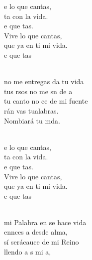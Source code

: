 \begin{cancion}%
	\begin{chorus}%
	e lo que cantas, \\
	ta con la vida.\\
	e que tas.\\
Vive lo que cantas,\\
	que ya en ti mi vida.\\
	e que tas    \\
	\end{chorus}%
	\jump\\
	no me entregas da tu vida\\
	tus rsos no me sn de a\\
	tu canto no ce de mi fuente\\
	rán vas tualabras.\\
	Nombiará tu mda.\\\jump\\
	\begin{chorus}%
	e lo que cantas, \\
	ta con la vida.\\
	e que tas.\\
Vive lo que cantas,\\
	que ya en ti mi vida.\\
	e que tas    \\
	\end{chorus}%
	\jump\\
	mi Palabra en  se hace vida\\
	ennces a desde alma,\\
	sí serácauce de mi Reino\\
	llendo a s mi a,\\

\end{cancion}
